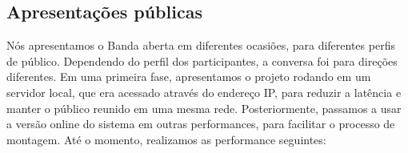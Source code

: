 





\subsection{Apresentações públicas}
Nós apresentamos o Banda aberta em diferentes ocasiões, para diferentes perfis de público. Dependendo do perfil dos participantes, a conversa foi para direções diferentes. Em uma primeira fase, apresentamos o projeto rodando em um servidor local, que era acessado através do endereço IP, para reduzir a latência e manter o público reunido em uma mesma rede. Posteriormente, passamos a usar a versão online do sistema em outras performances, para facilitar o processo de montagem. Até o momento, realizamos as performance seguintes:

